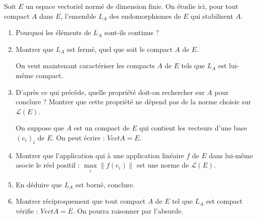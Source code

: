 \begin{exer}
Soit $E$ un espace vectoriel normé de dimension finie. %
On \'etudie ici, pour tout compact $A$ dans $E$, l'ensemble $L_A$ des endomorphismes de $E$ qui stabilisent $A$.
\begin{enumerate}
\item Pourquoi les \'el\'ements de $L_A$ sont-ils continus ?
\item Montrer que $L_A$ est fermé, quel que soit le compact $A$ de $E$.
\begin{center}
On veut maintenant caract\'eriser les compacts $A$ de $E$ tels que $L_A$ est lui-m\^eme compact.
\end{center}
\item D'apr\`es ce qui pr\'ec\^ede, quelle propri\'et\'e doit-on rechercher sur $A$ pour conclure ? Montrer que cette propri\'et\'e ne d\'epend pas de la norme choisie sur $\mathcal{L}(E)$.
\begin{center}
On suppose que $A$ est un compact de $E$ qui contient les vecteurs d'une base $(e_i)_i$ de $E$. On peut \'ecrire : $Vect A = E$.
\end{center}
\item Montrer que l'application qui \`a une application lin\'eaire $f$ de $E$ dans lui-m\^eme asocie le r\'eel positif : $\max\limits_i \|f(e_i)\|$ est une norme de $\mathcal{L}(E)$.
\item En d\'eduire que $L_A$ est born\'e, conclure.
\item Montrer r\'eciproquement que tout compact $A$ de $E$ tel que $L_A$ est compact v\'erifie : $Vect A = E$. On pourra raisonner par l'absurde.
\end{enumerate}
\end{exer}